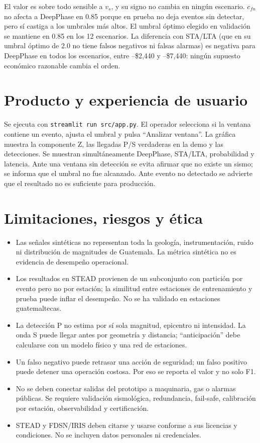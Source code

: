 \documentclass[11pt,letterpaper]{article}
\begin{document}
El valor es sobre todo sensible a $v_s$, y su signo no cambia en ningún
escenario. $c_{fn}$ no afecta a DeepPhase en 0.85 porque en prueba no deja
eventos sin detectar, pero sí castiga a los umbrales más altos. El umbral
óptimo elegido en validación se mantiene en 0.85 en los 12 escenarios. La
diferencia con STA/LTA (que en su umbral óptimo de 2.0 no tiene falsos negativos
ni falsas alarmas) es negativa para DeepPhase en todos los escenarios, entre
--\$2,440 y --\$7,440: ningún supuesto económico razonable cambia el orden.

\section{Producto y experiencia de usuario}
Se ejecuta con \texttt{streamlit run src/app.py}. El operador selecciona si la
ventana contiene un evento, ajusta el umbral y pulsa ``Analizar ventana''. La
gráfica muestra la componente Z, las llegadas P/S verdaderas en la demo y las
detecciones. Se muestran simultáneamente DeepPhase, STA/LTA, probabilidad y
latencia. Ante una ventana sin detección se evita afirmar que no existe un
sismo; se informa que el umbral no fue alcanzado. Ante evento no detectado se
advierte que el resultado no es suficiente para producción.

\section{Limitaciones, riesgos y ética}
\begin{itemize}[leftmargin=*]
\item Las señales sintéticas no representan toda la geología, instrumentación,
  ruido ni distribución de magnitudes de Guatemala. La métrica sintética no es
  evidencia de desempeño operacional.
\item Los resultados en STEAD provienen de un subconjunto con partición por
  evento pero no por estación; la similitud entre estaciones de entrenamiento y
  prueba puede inflar el desempeño. No se ha validado en estaciones guatemaltecas.
\item La detección P no estima por sí sola magnitud, epicentro ni intensidad.
  La onda S puede llegar antes por geometría y distancia; ``anticipación'' debe
  calcularse con un modelo físico y una red de estaciones.
\item Un falso negativo puede retrasar una acción de seguridad; un falso positivo
  puede detener una operación costosa. Por eso se reporta el valor y no solo F1.
\item No se deben conectar salidas del prototipo a maquinaria, gas o alarmas
  públicas. Se requiere validación sismológica, redundancia, fail-safe,
  calibración por estación, observabilidad y certificación.
\item STEAD y FDSN/IRIS deben citarse y usarse conforme a sus licencias y
  condiciones. No se incluyen datos personales ni credenciales.
\end{itemize}
\end{document}
